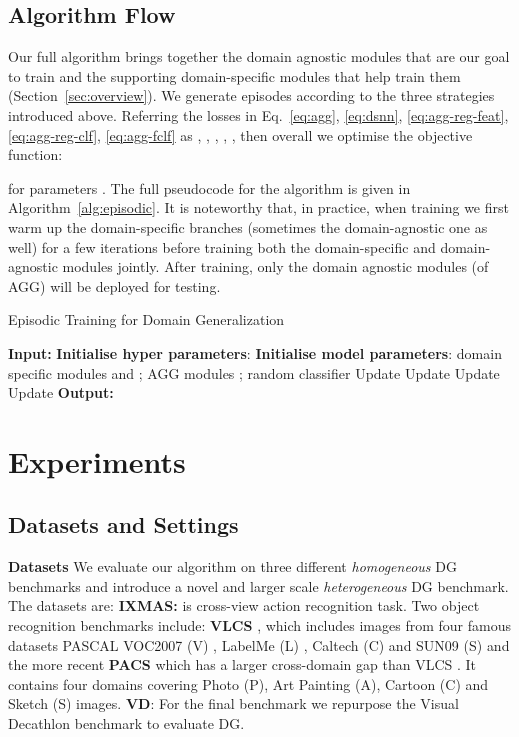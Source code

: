\documentclass[10pt,twocolumn,letterpaper]{article}
\newcommand{\keypoint}[1]{\vspace{0.1cm}\noindent\textbf{#1}\quad}
\begin{document}
\subsection{Algorithm Flow}
Our full algorithm brings together the domain agnostic modules that are our goal to train and the supporting domain-specific modules that help train them (Section~\ref{sec:overview}). We generate episodes according to the three strategies introduced above. Referring the losses in Eq.~\ref{eq:agg}, \ref{eq:dsnn}, \ref{eq:agg-reg-feat}, \ref{eq:agg-reg-clf}, \ref{eq:agg-fclf} as , , , , , then overall we optimise the objective function:


\noindent for parameters . The full pseudocode for the algorithm is given in Algorithm~\ref{alg:episodic}.  It is noteworthy that, in practice,  when training we first warm up the domain-specific branches (sometimes the domain-agnostic one as well) for a few iterations before training both the domain-specific and domain-agnostic modules jointly. {After training, only the domain agnostic modules (of AGG) will be deployed for testing.} 



\begin{algorithm}[t]
\caption{Episodic Training for Domain Generalization}\label{alg:episodic}
\begin{algorithmic}[1]
\State \textbf{Input:} 
\State \textbf{Initialise hyper parameters}: 
\State \textbf{Initialise model parameters}: 
domain specific modules  and ; AGG modules ; random classifier 
\For{}
\State Update 
\State Update 
\EndFor
\State Update 
\State Update 
\EndWhile
\State \textbf{Output:} 
\end{algorithmic}
\end{algorithm}




\section{Experiments}
\subsection{Datasets and Settings}
\keypoint{Datasets}
We evaluate our algorithm on three different \emph{homogeneous} DG benchmarks and introduce a  novel and larger scale \emph{heterogeneous} DG benchmark. The datasets are: \textbf{IXMAS:} \cite{daniel2006ixmax} is cross-view action recognition task. Two object recognition benchmarks include: \textbf{VLCS} \cite{chen2013vlcs}, which includes images from four famous datasets PASCAL VOC2007 (V) \cite{Everingham10}, LabelMe (L) \cite{russell08labelme}, Caltech (C) \cite{Feifei2004caltech} and SUN09 (S) \cite{Choi2010sun09} and the more recent \textbf{PACS} which has a larger cross-domain gap than VLCS \cite{Li2017dg}. It contains four domains covering Photo (P), Art Painting (A), Cartoon (C) and Sketch (S) images. \textbf{VD}: For the final benchmark we repurpose the Visual Decathlon \cite{Rebuffi17} benchmark to evaluate DG.
\end{document}

